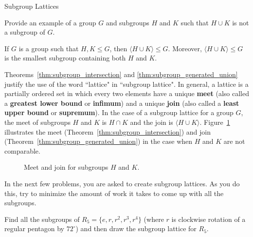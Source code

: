 \begin{section}{Subgroup Lattices}
\begin{problem}
Provide an example of a group $G$ and subgroups $H$ and $K$ such that $H\cup K$ is not a subgroup of $G$.
\end{problem}

\begin{theorem}\label{thm:subgroup_generated_union}
If $G$ is a group such that $H,K\leq G$, then $\langle H\cup K\rangle\leq G$. Moreover, $\langle H\cup K\rangle\leq G$ is the smallest subgroup containing both $H$ and $K$.
\end{theorem}

Theorems~\ref{thm:subgroup_intersection} and \ref{thm:subgroup_generated_union} justify the use of the word ``lattice" in ``subgroup lattice".  In general, a lattice is a partially ordered set in which every two elements have a unique \textbf{meet} (also called a \textbf{greatest lower bound} or \textbf{infimum}) and a unique \textbf{join} (also called a \textbf{least upper bound} or \textbf{supremum}).  In the case of a subgroup lattice for a group $G$, the meet of subgroups $H$ and $K$ is $H\cap K$ and the join is $\langle H\cup K\rangle$.  Figure~\ref{fig:diamond} illustrates the meet (Theorem~\ref{thm:subgroup_intersection}) and join (Theorem~\ref{thm:subgroup_generated_union}) in the case when $H$ and $K$ are not comparable.

\begin{figure}[!ht]
\centering
{}
\caption{Meet and join for subgroups $H$ and $K$.}
\label{fig:diamond}
\end{figure}

In the next few problems, you are asked to create subgroup lattices.  As you do this, try to minimize the amount of work it takes to come up with all the subgroups.

\begin{problem}
Find all the subgroups of $R_5=\{e,r,r^2,r^3,r^4\}$ (where $r$ is clockwise rotation of a regular pentagon by $72^{\circ}$) and then draw the subgroup lattice for $R_5$.
\end{problem}


\end{section}
